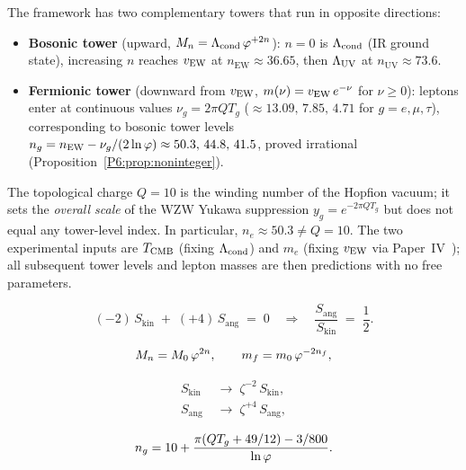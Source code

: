 \begin{remark}
\label{P6:rem:tower_directions}
The framework has two complementary towers that run in opposite directions:
\begin{itemize}[noitemsep]
\item \textbf{Bosonic tower} (upward, $M_n = \Lambda_{\mathrm{cond}}\,\varphi^{+2n}$):
  $n=0$ is $\Lambda_{\mathrm{cond}}$ (IR ground state), increasing $n$ reaches $v_{\mathrm{EW}}$
  at $n_\mathrm{EW}\approx36.65$, then $\Lambda_{\mathrm{UV}}$ at $n_\mathrm{UV}\approx73.6$.
\item \textbf{Fermionic tower} (downward from $v_{\mathrm{EW}}$,
  $m(\nu) = v_{\mathrm{EW}}\,e^{-\nu}$ for $\nu\geq0$):
  leptons enter at continuous values
  $\nu_g = 2\pi QT_g$ ($\approx13.09,\,7.85,\,4.71$ for $g=e,\mu,\tau$),
  corresponding to bosonic tower levels
  $n_g = n_\mathrm{EW} - \nu_g/(2\ln\varphi)\approx50.3,\,44.8,\,41.5$,
  proved irrational (Proposition~\ref{P6:prop:noninteger}).
\end{itemize}
The topological charge $Q=10$ is the winding number of the Hopfion vacuum;
it sets the \emph{overall scale} of the WZW Yukawa suppression
$y_g = e^{-2\pi QT_g}$ but does not equal any tower-level index.
In particular, $n_e\approx50.3\neq Q=10$.
The two experimental inputs are $T_{\mathrm{CMB}}$ (fixing $\Lambda_{\mathrm{cond}}$) and $m_e$
(fixing $v_{\mathrm{EW}}$ via Paper~IV~\cite{Paper4}); all subsequent tower levels
and lepton masses are then predictions with no free parameters.
\end{remark}

\begin{equation}
  (-2)\,S_{\mathrm{kin}} \;+\; (+4)\,S_{\mathrm{ang}} \;=\; 0
  \quad\Longrightarrow\quad
  \frac{S_{\mathrm{ang}}}{S_{\mathrm{kin}}} \;=\; \frac{1}{2}.
  \label{P6:eq:derrick_balance}
\end{equation}

\begin{equation}
  M_n = M_0\,\varphi^{2n}, \qquad
  m_f = m_0\,\varphi^{-2n_f},
  \label{P6:eq:hierarchy_axiom}
\end{equation}

\begin{align}
  S_{\mathrm{kin}} &\;\to\; \zeta^{-2}\,S_{\mathrm{kin}},
  \label{P6:eq:kin_scaling} \\[3pt]
  S_{\mathrm{ang}} &\;\to\; \zeta^{+4}\,S_{\mathrm{ang}},
  \label{P6:eq:ang_scaling}
\end{align}

\begin{equation}
  n_g = 10 + \frac{\pi(Q T_g + 49/12) - 3/800}{\ln\varphi}.
  \label{P6:eq:ng_expanded}
\end{equation}

